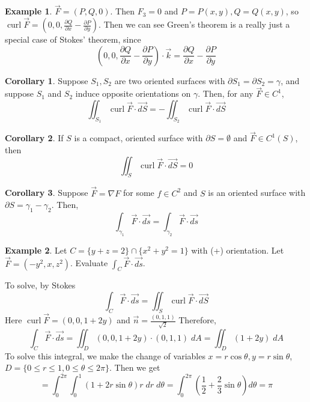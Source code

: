 \documentclass[11pt]{article}
\theoremstyle{definition}
\newtheorem{exmp}{Example}[section]
\theoremstyle{definition}
\DeclareMathOperator{\curl}{curl}
\newtheorem{corollary}{Corollary}
\theoremstyle{definition}
\theoremstyle{remark}
\begin{document}
\begin{exmp}
    $\vec{F} = (P, Q, 0)$. Then $F_3 = 0$ and $P = P(x, y), Q = Q(x, y)$, so $\curl \vec{F} = \left( 0, 0, \frac{\partial Q}{\partial x} - \frac{\partial P}{\partial y} \right)$.
    Then we can see Green's theorem is a really just a special case of Stokes' theorem, since
    \[
        \left( 0, 0, \frac{\partial Q}{ \partial x} - \frac{\partial P}{\partial y} \right) \cdot \vec{k} = \frac{\partial Q}{\partial x} - \frac{\partial P}{\partial y}
    \]    
\end{exmp}

\begin{corollary}
    Suppose $S_1, S_2$ are two oriented surfaces with $\partial S_1 = \partial S_2 = \gamma$, and suppose $S_1$ and $S_2$ induce 
    opposite orientations on $\gamma$. Then, for any $\vec{F} \in C^1$,
    \[
        \iint_{S_1} \curl \vec{F} \cdot \vec{dS} = - \iint_{S_2} \curl \vec{F} \cdot \vec{dS}
    \]      
\end{corollary}

\begin{corollary}
    If $S$ is a compact, oriented surface with $\partial S = \emptyset$ and $\vec{F} \in C^1(S)$, then
    \[
        \iint_S \curl \vec{F} \cdot \vec{dS} = 0
    \]  
\end{corollary}

\begin{corollary}
    Suppose $\vec{F} = \nabla F$ for some $f \in C^2$ and $S$ is an oriented surface with $\partial S = \gamma_1 - \gamma_2$.
    Then,
    \[
        \int_{\gamma_1} \vec{F} \cdot \vec{ds} = \int_{\gamma_2} \vec{F} \cdot \vec{ds}
    \]     
\end{corollary}

\begin{exmp}
    Let $C = \{ y + z = 2\} \cap \{x^2 + y^2 = 1 \}$ with (+) orientation. Let $\vec{F} = (-y^2, x, z^2)$. Evaluate $\int_C \vec{F} \cdot \vec{ds}$.
    
    To solve, by Stokes
    \[
        \int_C \vec{F} \cdot \vec{ds} = \iint_S \curl \vec{F} \cdot \vec{dS}
    \] 
    Here $\curl \vec{F} = (0, 0, 1 + 2y)$ and $\vec{n} = \frac{(0, 1, 1)}{\sqrt{2}}$ 
    Therefore,
    \[
        \int_C \vec{F} \cdot \vec{ds} = \iint_D (0, 0, 1 + 2y) \cdot (0, 1, 1) \; dA = \iint_D (1 + 2y) \; dA
    \] 
    To solve this integral, we make the change of variables $x = r \cos \theta, y = r \sin \theta$, $D = \{0 \leq r \leq 1, 0 \leq \theta \leq 2 \pi \}$.
    Then we get
    \[
        = \int_0^{2 \pi} \int_0^1 (1 + 2r \sin \theta) r \; dr \; d \theta = \int_0^{2 \pi} \left( \frac{1}{2} + \frac{2}{3} \sin \theta \right) d\theta = \pi
    \]   
\end{exmp}
\end{document}

